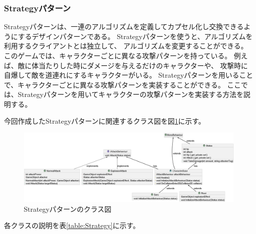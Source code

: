 \documentclass[dvipdfmx,fleqn,article]{jlreq}
\begin{document}
\subsubsection{Strategyパターン}
Strategyパターンは、一連のアルゴリズムを定義してカプセル化し交換できるようにするデザインパターンである。
Strategyパターンを使うと、アルゴリズムを利用するクライアントとは独立して、
アルゴリズムを変更することができる。
このゲームでは、キャラクターごとに異なる攻撃パターンを持っている。
例えば、敵に体当たりした時にダメージを与えるだけのキャラクターや、
攻撃時に自爆して敵を道連れにするキャラクターがいる。
Strategyパターンを用いることで、キャラクターごとに異なる攻撃パターンを実装することができる。
ここでは、Strategyパターンを用いてキャラクターの攻撃パターンを実装する方法を説明する。



今回作成したStrategyパターンに関連するクラス図を図\ref{fig:Strategy}に示す。
\begin{figure}[H]
    \centering
    \includegraphics[width=1\textwidth]{figures/Strategy.png}
    \caption{Strategyパターンのクラス図}
    \label{fig:Strategy}
\end{figure}

各クラスの説明を表\ref{table:Strategy}に示す。
\end{document}
